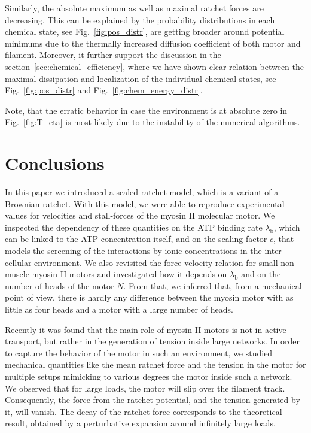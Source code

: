 \documentclass[aps,pre,twocolumn,showpacs,showkeys,superscriptaddress,floatfix]{revtex4-1}
\begin{document}
Similarly, the absolute maximum as well as maximal ratchet forces are decreasing.
This can be explained by the probability distributions in each chemical state, see Fig.~\ref{fig:pos_distr}, 
are getting broader around potential minimums due to the thermally increased diffusion coefficient of both motor and filament.  
Moreover, it further support the discussion in the section~\ref{sec:chemical_efficiency}, 
where we have shown clear relation between the maximal dissipation and localization of the individual chemical states, 
see Fig.~\ref{fig:pos_distr} and Fig.~\ref{fig:chem_energy_distr}.

Note, that the erratic behavior in case the environment is at absolute zero in Fig.~\ref{fig:T_eta} is most likely due to the instability of the numerical algorithms. 




\section{Conclusions}
In this paper we introduced a scaled-ratchet model, which is a variant of a Brownian ratchet.
With this model, we were able to reproduce experimental values for  velocities and stall-forces of the myosin II molecular motor. 
We inspected the dependency of these quantities on the ATP binding rate $\lambda_\text{b}$, which can be linked to the ATP concentration itself, 
and on the scaling factor $c$, that models the screening of the interactions by ionic concentrations in the inter-cellular environment.
We also revisited the force-velocity relation for small non-muscle myosin II motors 
and investigated how it depends on $\lambda_\text{b}$ and on the number of heads of the motor $N$.
From that, we inferred that, from a mechanical point of view, there is hardly any difference between the myosin motor with as little as four heads and a motor with a large number of heads. 

Recently it was found that the main role of myosin II motors is not in active transport, but rather in the generation of tension inside large networks. 
In order to capture the behavior of the motor in such an environment,    
we studied mechanical quantities like the mean ratchet force and the tension in the motor for multiple setups mimicking to various degrees the motor inside such a network.
We observed that for large loads, the motor will slip over the filament track. 
Consequently, the force from the ratchet potential, and the tension generated by it, will vanish.
The decay of the ratchet force corresponds to the theoretical result, obtained by a perturbative expansion around infinitely large loads.
\end{document}
